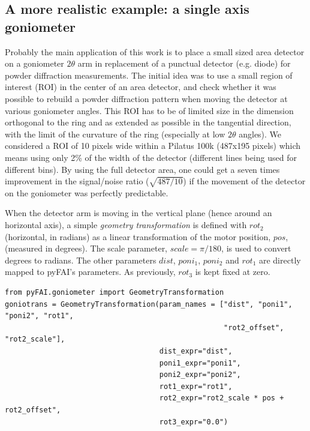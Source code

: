 \documentclass[preprint]{iucr}              %
\begin{document}
\subsection{A more realistic example: a single axis goniometer}

Probably the main application of this work is to place a small sized area detector
on a goniometer $2\theta$ arm in replacement of a punctual detector (e.g. diode) for 
powder diffraction measurements. 
The initial idea was to use a small region of interest (ROI) in the center of
an area detector, and check whether it was possible to rebuild a powder diffraction pattern
when moving the detector at various goniometer angles.
This ROI has to be of limited size in the dimension orthogonal to the ring and as extended
as possible in the tangential direction, with the limit of the curvature of the ring 
(especially at low $2\theta$ angles).
We considered a ROI of 10 pixels wide within a Pilatus 100k (487x195 pixels)
which means using only 2\% of the width of the detector (different lines being used for different bins). 
By using the full detector area, one could get a seven times improvement in the signal/noise ratio
($\sqrt{487/10}$) if the movement of the detector on the goniometer was perfectly predictable.

When the detector arm is moving in the vertical plane (hence around an horizontal axis), 
a simple \textit{geometry transformation} is defined with $rot_2$ (horizontal, in radians) as a
linear transformation of the motor position, $pos$, (measured in degrees).
The scale parameter, $scale = \pi / 180$, is used to convert degrees to radians.
The other parameters $dist$, $poni_1$, $poni_2$ and $rot_1$ are directly mapped
to pyFAI's parameters.
As previously, $rot_3$ is kept fixed at zero.

\begin{verbatim}
from pyFAI.goniometer import GeometryTransformation
goniotrans = GeometryTransformation(param_names = ["dist", "poni1", "poni2", "rot1",
                                                   "rot2_offset", "rot2_scale"],
                                    dist_expr="dist", 
                                    poni1_expr="poni1",
                                    poni2_expr="poni2", 
                                    rot1_expr="rot1", 
                                    rot2_expr="rot2_scale * pos + rot2_offset", 
                                    rot3_expr="0.0")
\end{verbatim}
\end{document}
